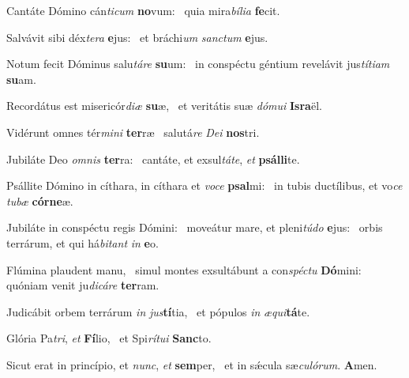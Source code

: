 \item Cantáte Dómino cán\textit{ticum} \textbf{no}vum:~\psstar{} quia mira\textit{bília} \textbf{fe}cit.
\item Salvávit sibi déx\textit{tera} \textbf{e}jus:~\psstar{} et bráchi\textit{um} \textit{sanctum} \textbf{e}jus.
\item Notum fecit Dóminus salu\textit{táre} \textbf{su}um:~\psstar{} in conspéctu géntium revelávit jus\textit{títiam} \textbf{su}am.
\item Recordátus est misericór\textit{diæ} \textbf{su}æ,~\psstar{} et veritátis suæ \textit{dómui} \textbf{Is}\textbf{ra}ël.
\item Vidérunt omnes tér\textit{mini} \textbf{ter}ræ~\psstar{} salutá\textit{re} \textit{Dei} \textbf{nos}tri.
\item Jubiláte Deo \textit{omnis} \textbf{ter}ra:~\psstar{} cantáte, et exsul\textit{táte}, \textit{et} \textbf{psál}\textbf{li}te.
\item Psállite Dómino in cíthara, in cíthara et \textit{voce} \textbf{psal}mi:~\psstar{} in tubis ductílibus, et vo\textit{ce} \textit{tubæ} \textbf{cór}\textbf{ne}æ.
\item Jubiláte in conspéctu regis Dómini:~\pscross{} moveátur mare, et pleni\textit{túdo} \textbf{e}jus:~\psstar{} orbis terrárum, et qui há\textit{bitant} \textit{in} \textbf{e}o.
\item Flúmina plaudent manu,~\pscross{} simul montes exsultábunt a con\textit{spéctu} \textbf{Dó}mini:~\psstar{} quóniam venit ju\textit{dicáre} \textbf{ter}ram.
\item Judicábit orbem terrárum \textit{in} \textit{jus}\textbf{tí}tia,~\psstar{} et pópulos \textit{in} \textit{æqui}\textbf{tá}te.
\item Glória Pa\textit{tri}, \textit{et} \textbf{Fí}lio,~\psstar{} et Spi\textit{rítui} \textbf{Sanc}to.
\item Sicut erat in princípio, et \textit{nunc}, \textit{et} \textbf{sem}per,~\psstar{} et in sǽcula sæ\textit{culórum}. \textbf{A}men.
